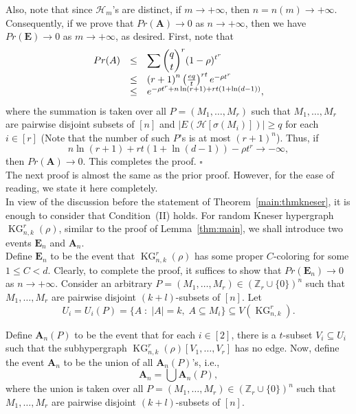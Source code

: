 \documentclass[11pt]{amsart}
\theoremstyle{definition}
\theoremstyle{remark}
\def\Z{\mathbb{Z}}
\def\ds{\displaystyle}
\def\KG{\operatorname{KG}}
\begin{document}
Also, note that since $\mathcal{H}_m$'s are distinct, if $m\rightarrow +\infty$, then 
$n=n(m)\rightarrow +\infty$.
Consequently, if we prove that $Pr(\mathbf{A})\rightarrow 0$  as $n\rightarrow +\infty$, then we have
$Pr(\mathbf{E})\rightarrow 0$ as $m\rightarrow +\infty$, as desired. 
First, note that  
$$\begin{array}{lll}
Pr(A) &\leq & \ds\sum {q\choose t}^r(1-\rho)^{t^r}\\
	 & \leq & \left(r+1\right)^n\left({eq\over t}\right)^{rt}e^{-\rho t^r}\\ 
	 & \leq & e^{-\rho t^r+n\ln(r+1)+rt(1+\ln (d-1))},
\end{array}$$ 
where the summation is taken over all $P=(M_1,\ldots,M_r)$ such that $M_1,\ldots,M_r$ 
are pairwise disjoint subsets of $[n]$ and 
$|E(\mathcal{H}[\sigma(M_i)])|\geq q$ for each $i\in [r]$ (Note that the number 
of such $P$'s is at most $(r+1)^n$).
Thus, if 
$${n\ln(r+1)+rt(1+\ln (d-1))}-\rho t^r\rightarrow -\infty,$$ 
then $Pr(\mathbf{A})\rightarrow 0$. This completes the proof. \hfill$\square$\\

The next proof is almost the same as the prior proof. However, for the ease of reading, 
we state it here completely. \\  

In view of the discussion before the statement of Theorem~\ref{main:thmkneser},
it is enough to consider that Condition~(II) holds. 
For random Kneser hypergraph $\KG^r_{n,k}(\rho)$, similar to the proof of Lemma~\ref{thm:main},  we shall introduce two events $\mathbf{E}_n$ and $\mathbf{A}_n$.\\
  Define $\mathbf{E}_n$ to be the 
event that $\KG^r_{n,k}(\rho)$ has some proper $C$-coloring for some $1\leq C<d.$ 
Clearly, to complete the proof, it suffices to show that 
$Pr(\mathbf{E}_n)\rightarrow 0$ as $n\rightarrow +\infty$.  
Consider an arbitrary $P=(M_1,\ldots,M_r)\in(\Z_r\cup\{0\})^n$ 
such that $M_1,\ldots,M_r$ are pairwise disjoint $(k+l)$-subsets of $[n]$.
Let $$U_i=U_i(P)=\{A\;:\; |A|=k,\; A\subseteq M_i\}
\subseteq V(\KG^r_{n,k}).$$ 

Define $\mathbf{A}_n(P)$ to be the event that for each $i\in [2]$, there is
a $t$-subset $V_i\subseteq U_i$ such that 
the subhypergraph $\KG^r_{n,k}(\rho)[V_1,\ldots,V_r]$
has no edge. 
Now, define the event $\mathbf{A}_n$ to be the union of all $\mathbf{A}_n(P)$'s, i.e., 
 $$\mathbf{A}_n=\bigcup \mathbf{A}_n(P),$$
where the union is taken over all $P=(M_1,\ldots,M_r)\in (\Z_r\cup\{0\})^n$ 
such that $M_1,\ldots,M_r$ are pairwise disjoint  $(k+l)$-subsets of $[n]$.   
\end{document}
